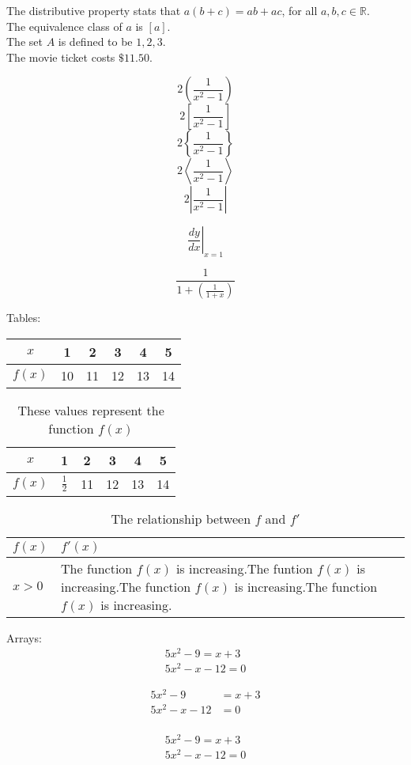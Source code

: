 \documentclass[12pt]{article}
\begin{document}
The distributive property stats that $a(b+c)=ab+ac$, for all $a,b,c \in \mathbb{R}$.\\[6pt]
The equivalence class of $a$ is $[a]$.\\[6pt]
The set $A$ is defined to be ${1,2,3}$.\\[6pt]
The movie ticket costs $\$11.50$.

$$2\left(	\frac{1}{x^2-1}	\right)$$
$$2\left[	\frac{1}{x^2-1}	\right]$$
$$2\left\{	\frac{1}{x^2-1}	\right\}$$
$$2\left\langle	\frac{1}{x^2-1}	\right\rangle$$
$$2\left|	\frac{1}{x^2-1}	\right|$$

$$\left.	\frac{dy}{dx}\right|_{x=1}$$

$$\frac{1}{1+	\left(\frac{1}{1+x}\right)}$$

Tables:\\

\begin{tabular}{|c||c|c|c|c|c|} %
\hline
$x$ & 1 & 2&3&4&5\\ \hline
$f(x)$ & 10 & 11&12&13&14\\ \hline
\end{tabular}
\vspace{1cm}

\begin{table}[H]
\centering
\def\arraystretch{1.8}
\begin{tabular}{|c||c|c|c|c|c|} %
\hline
$x$ & 1 & 2&3&4&5\\ \hline
$f(x)$ & $\frac{1}{2}$ & 11&12&13&14\\ \hline
\end{tabular}
\caption{These values represent the function $f(x)$}
\end{table}
\vspace{1cm}

\begin{table}[H]
\centering
\caption{The relationship between $f$ and $f'$}
\def\arraystretch{1.8}
\begin{tabular}{|l|p{3in}|} %
\hline
$f(x)$ & $f'(x)$\\ \hline
$x>0$ & The function $f(x)$ is increasing.The funtion $f(x)$ is increasing.The function $f(x)$ is increasing.The function $f(x)$ is increasing.\\ \hline
\end{tabular}
\end{table}
\vspace{1cm}

Arrays:\\
\begin{align} %
5x^2 -9=x+3\\
5x^2-x-12=0
\end{align}

\begin{align*} %
5x^2 -9&=x+3\\
5x^2-x-12&=0\\
\end{align*}

\begin{align} %
5x^2 -9=x+3\\
5x^2-x-12=0
\end{align}
\end{document}
